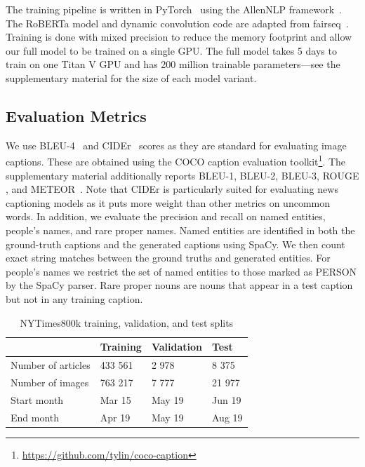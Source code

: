 The training pipeline is written in PyTorch~\cite{Paszke2017Automatic} using
the AllenNLP framework~\cite{Gardner2017AllenNLP}. The RoBERTa model and
dynamic convolution code are adapted from fairseq~\cite{Ott2019Fairseq}.
Training is done with mixed precision to reduce the memory footprint and allow
our full model to be trained on a single GPU. The full model takes 5 days to
train on one Titan V GPU and has 200 million trainable parameters---see the
supplementary material for the size of each model variant.

\secmoveup
\subsection{Evaluation Metrics}

We use BLEU-4~\cite{Papineni2002Bleu} and CIDEr~\cite{Vedantam2015CIDEr} scores
as they are standard for evaluating image captions. These are obtained using
the COCO caption evaluation
toolkit\footnote{\href{https://github.com/tylin/coco-caption}
{https://github.com/tylin/coco-caption}}. The supplementary material
additionally reports BLEU-1, BLEU-2, BLEU-3, ROUGE \cite{Lin2004ROUGE}, and
METEOR~\cite{Denkowski2014Meteor}. Note that CIDEr is particularly suited for
evaluating news captioning models as it puts more weight than other metrics on
uncommon words. In addition, we evaluate the precision and recall on named
entities, people's names, and rare proper names. Named entities are identified
in both the ground-truth captions and the generated captions using SpaCy. We
then count exact string matches between the ground truths and generated
entities. For people's names we restrict the set of named entities to those
marked as PERSON by the SpaCy parser. Rare proper nouns are nouns that appear
in a test caption but not in any training caption.


\begin{table}[t]
	\caption {NYTimes800k training, validation, and test splits}
	\label{tab:splits}
	\centering
	\begin{tabularx}{\linewidth}{lXXX}
		\toprule
		  & Training  &   Validation & Test \\
		\midrule
      Number of articles & 433 561 & 2 978 & 8 375 \\
      Number of images  & 763 217 & 7 777 & 21 977 \\
      Start month & Mar 15 & May 19 & Jun 19 \\
      End month & Apr 19 & May 19 & Aug 19 \\
		\bottomrule
	\end{tabularx}
\end{table}



